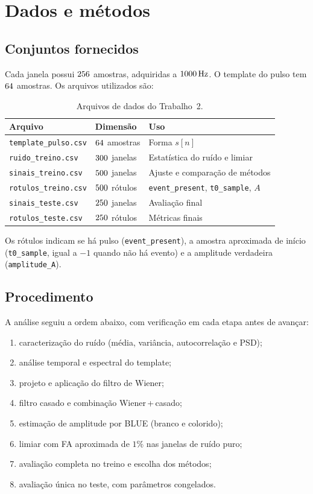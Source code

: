 \section{Dados e métodos}

\subsection{Conjuntos fornecidos}

Cada janela possui \(256\) amostras, adquiridas a \(1000\,\mathrm{Hz}\).
O template do pulso tem \(64\) amostras. Os arquivos utilizados são:

\begin{table}[H]
\centering
\caption{Arquivos de dados do Trabalho~2.}
\label{tab:dados-t2}
\begin{tabular}{llp{7.2cm}}
\toprule
Arquivo & Dimensão & Uso \\
\midrule
\texttt{template\_pulso.csv} & \(64\) amostras & Forma \(s[n]\) \\
\texttt{ruido\_treino.csv} & \(300\) janelas & Estatística do ruído e limiar \\
\texttt{sinais\_treino.csv} & \(500\) janelas & Ajuste e comparação de métodos \\
\texttt{rotulos\_treino.csv} & \(500\) rótulos & \texttt{event\_present}, \texttt{t0\_sample}, \(A\) \\
\texttt{sinais\_teste.csv} & \(250\) janelas & Avaliação final \\
\texttt{rotulos\_teste.csv} & \(250\) rótulos & Métricas finais \\
\bottomrule
\end{tabular}
\end{table}

Os rótulos indicam se há pulso (\texttt{event\_present}), a amostra
aproximada de início (\texttt{t0\_sample}, igual a \(-1\) quando não há
evento) e a amplitude verdadeira (\texttt{amplitude\_A}).

\subsection{Procedimento}

A análise seguiu a ordem abaixo, com verificação em cada etapa antes de avançar:

\begin{enumerate}
  \item caracterização do ruído (média, variância, autocorrelação e PSD);
  \item análise temporal e espectral do template;
  \item projeto e aplicação do filtro de Wiener;
  \item filtro casado e combinação Wiener\,+\,casado;
  \item estimação de amplitude por BLUE (branco e colorido);
  \item limiar com FA aproximada de \(1\%\) nas janelas de ruído puro;
  \item avaliação completa no treino e escolha dos métodos;
  \item avaliação única no teste, com parâmetros congelados.
\end{enumerate}

